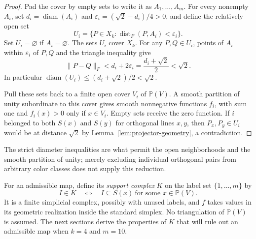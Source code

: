 \begin{proof}
Pad the cover by empty sets to write it as $A_1,\ldots,A_m$.
For every nonempty $A_i$, set $d_i=\operatorname{diam}(A_i)$ and
$\varepsilon_i=(\sqrt2-d_i)/4>0$, and define the relatively open set
\[
 U_i=\{P\in X_k:\operatorname{dist}_F(P,A_i)<\varepsilon_i\}.
\]
Set $U_i=\varnothing$ if $A_i=\varnothing$.  The sets $U_i$ cover $X_k$.
For any $P,Q\in U_i$, points of $A_i$ within $\varepsilon_i$ of $P,Q$
and the triangle inequality give
\[
 \|P-Q\|_F<d_i+2\varepsilon_i
 =\frac{d_i+\sqrt2}{2}<\sqrt2.
\]
In particular $\operatorname{diam}(U_i)\leq(d_i+\sqrt2)/2<\sqrt2$.

Pull these sets back to a finite open cover $V_i$ of $\mathbb P(V)$.
A smooth partition of unity subordinate to this cover
\cite[Theorem~2.23]{Lee2013} gives smooth
nonnegative functions $f_i$, with sum one and $f_i(x)>0$ only if
$x\in V_i$.  Empty sets receive the zero function.  If $i$ belonged to
both $S(x)$ and $S(y)$ for orthogonal lines $x,y$, then $P_x,P_y\in U_i$
would be at distance $\sqrt2$ by Lemma~\ref{lem:projector-geometry},
a contradiction.
\end{proof}

The strict diameter inequalities are what permit the open neighborhoods
and the smooth partition of unity; merely excluding individual orthogonal
pairs from arbitrary color classes does not supply this reduction.

For an admissible map, define its \emph{support complex} $K$ on the label
set $\{1,\ldots,m\}$ by
\[
 I\in K\quad\Longleftrightarrow\quad
 I\subseteq S(x)\ \text{for some }x\in\mathbb P(V).
\]
It is a finite simplicial complex, possibly with unused labels, and $f$
takes values in its geometric realization inside the standard simplex.
No triangulation of $\mathbb P(V)$ is assumed.  The next sections derive
the properties of $K$ that will rule out an admissible map when $k=4$ and
$m=10$.
